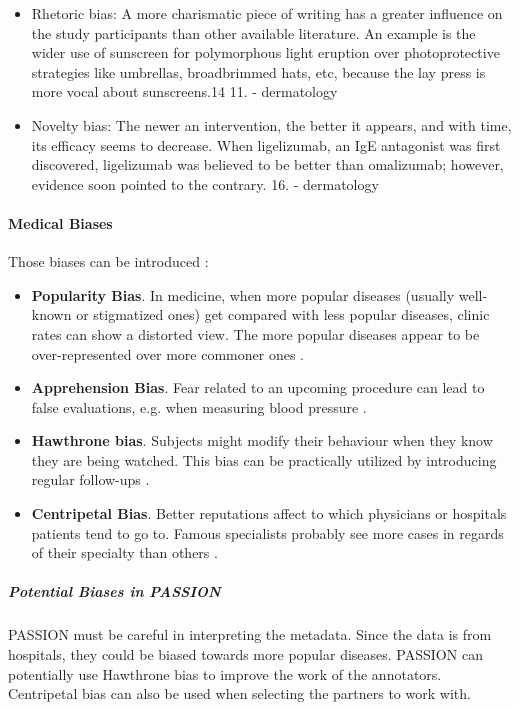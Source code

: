 \begin{refsection}
\begin{itemize}
			\item Rhetoric bias: A more charismatic piece of writing has a greater influence on the study participants than other available literature. An example is the wider use of sunscreen for polymorphous light eruption over photoprotective strategies like umbrellas, broadbrimmed hats, etc, because the lay press is more vocal about sunscreens.14 11. \autocite{Chakraborty_2024} - dermatology
			
			\item  Novelty bias: The newer an intervention, the better it appears, and with time, its efficacy seems to decrease. When ligelizumab, an IgE antagonist was first discovered, ligelizumab was believed to be better than omalizumab; however, evidence soon pointed to the contrary. 16.\autocite{Chakraborty_2024} - dermatology			
			\rawcitationusedend
		\end{itemize}
		\rawcitationend
		
		
		\paragraph{Medical Biases}
		
		Those biases can be introduced :
		\begin{itemize}
			\item \textbf{Popularity Bias}. In medicine, when more popular diseases (usually well-known or stigmatized ones) get compared with less popular diseases, clinic rates can show a distorted view. The more popular diseases appear to be over-represented over more commoner ones \autocite{Chakraborty_2024, c9, c6}.
			\item \textbf{Apprehension Bias}. Fear related to an upcoming procedure can lead to false evaluations, e.g. when measuring blood pressure \autocite{Chakraborty_2024, c13}.
			\item \textbf{Hawthrone bias}. Subjects might modify their behaviour when they know they are being watched. This bias can be practically utilized by introducing regular follow-ups \autocite{Chakraborty_2024, c8}.
			\item \textbf{Centripetal Bias}. Better reputations affect to which physicians or hospitals patients tend to go to. Famous specialists probably see more cases in regards of their specialty than others \autocite{Chakraborty_2024, c12}.
		\end{itemize}
		
		
		\subparagraph{Potential Biases in PASSION}
		PASSION must be careful in interpreting the metadata. Since the data is from hospitals, they could be biased towards more popular diseases.
		PASSION can potentially use Hawthrone bias to improve the work of the annotators.
		Centripetal bias can also be used when selecting the partners to work with.
		

\end{refsection}

